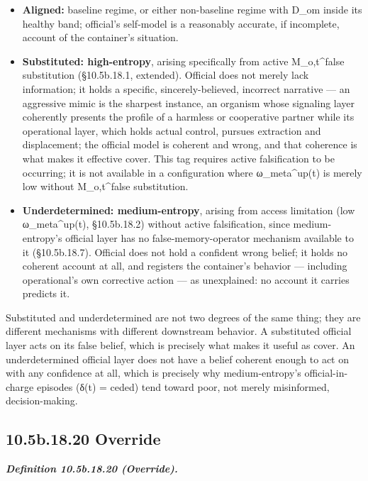 \documentclass[
]{article}
\begin{document}
\begin{itemize}
\item
  \textbf{Aligned:} baseline regime, or either non-baseline regime with
  D\_om inside its healthy band; official's self-model is a reasonably
  accurate, if incomplete, account of the container's situation.
\item
  \textbf{Substituted: high-entropy}, arising specifically from active
  M\_o,t\^{}false substitution (§10.5b.18.1, extended). Official does
  not merely lack information; it holds a specific, sincerely-believed,
  incorrect narrative --- an aggressive mimic is the sharpest instance,
  an organism whose signaling layer coherently presents the profile of a
  harmless or cooperative partner while its operational layer, which
  holds actual control, pursues extraction and displacement; the
  official model is coherent and wrong, and that coherence is what makes
  it effective cover. This tag requires active falsification to be
  occurring; it is not available in a configuration where
  ω\_meta\^{}up(t) is merely low without M\_o,t\^{}false substitution.
\item
  \textbf{Underdetermined: medium-entropy}, arising from access
  limitation (low ω\_meta\^{}up(t), §10.5b.18.2) without active
  falsification, since medium-entropy's official layer has no
  false-memory-operator mechanism available to it (§10.5b.18.7).
  Official does not hold a confident wrong belief; it holds no coherent
  account at all, and registers the container's behavior --- including
  operational's own corrective action --- as unexplained: no account it
  carries predicts it.
\end{itemize}

Substituted and underdetermined are not two degrees of the same thing;
they are different mechanisms with different downstream behavior. A
substituted official layer acts on its false belief, which is precisely
what makes it useful as cover. An underdetermined official layer does
not have a belief coherent enough to act on with any confidence at all,
which is precisely why medium-entropy's official-in-charge episodes
(δ(t) = ceded) tend toward poor, not merely misinformed,
decision-making.

\hypertarget{b.18.20-override}{%
\subsection{10.5b.18.20 Override}\label{b.18.20-override}}

\emph{\textbf{Definition 10.5b.18.20 (Override).}}
\end{document}
